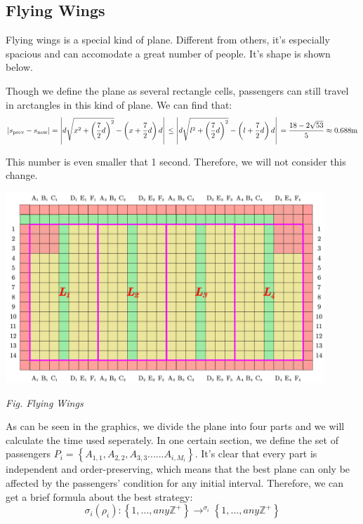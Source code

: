 \documentclass{article}
\begin{document}
	\subsection{Flying Wings}
	Flying  wings is a special kind of plane. Different from others, it's especially spacious and can accomodate a great number of people. It's shape is shown below.

	Though we define the plane as several rectangle cells, passengers can still travel in arctangles in this kind of plane. We can find that:
	$$\left| s_{\mathrm{prev}}-s_{\mathrm{now}} \right|=\left| d\sqrt{x^2+\left( \frac{7}{2}d \right) ^2}-\left( x+\frac{7}{2}d \right) d \right|\\\le \left| d\sqrt{l^2+\left( \frac{7}{2}d \right) ^2}-\left( l+\frac{7}{2}d \right) d \right|\\=\frac{18-2\sqrt{53}}{5}\approx 0.688\mathrm{m}\\$$

	This number is even smaller that 1 second. Therefore, we  will not consider this change.

	\begin{center}
		\includegraphics[width=12cm]{flyingwings.jpg}

		\small \textit{Fig. Flying Wings}
	\end{center}

	As can be seen in the graphics, we divide the plane into four parts and we will calculate the time used seperately. In one certain section, we define the set of passengers $P_i=\left\{A_{1,1},A_{2,2},A_{3,3}......A_{i,M_i}\right\}$. It's clear that every part is independent and order-preserving, which means that the best plane can only be affected by the passengers' condition for any initial interval. Therefore, we can get a brief formula about the best strategy:
	\[\sigma_i (\rho_i): \left\{1,..., any \mathbb{Z}^+\right\}\rightarrow^{\sigma_i} \left\{1,..., any \mathbb{Z}^+ \right\}\]
\end{document}
